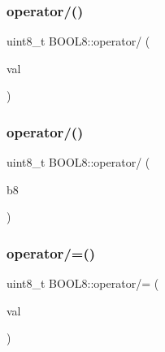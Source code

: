 \hypertarget{struct_b_o_o_l8_a10e18bcb3b312d506817ffc60765ba6b}{}\label{struct_b_o_o_l8_a10e18bcb3b312d506817ffc60765ba6b} 
\subsubsection{\texorpdfstring{operator/()}{operator/()}\hspace{0.1cm}{\footnotesize\ttfamily [1/2]}}
{\footnotesize\ttfamily uint8\+\_\+t B\+O\+O\+L8\+::operator/ (\begin{DoxyParamCaption}\item[{const uint8\+\_\+t}]{val }\end{DoxyParamCaption})\hspace{0.3cm}{\ttfamily [inline]}}

\hypertarget{struct_b_o_o_l8_a89f1bf36c915e91e5201ef357ee845d7}{}\label{struct_b_o_o_l8_a89f1bf36c915e91e5201ef357ee845d7} 
\subsubsection{\texorpdfstring{operator/()}{operator/()}\hspace{0.1cm}{\footnotesize\ttfamily [2/2]}}
{\footnotesize\ttfamily uint8\+\_\+t B\+O\+O\+L8\+::operator/ (\begin{DoxyParamCaption}\item[{const \hyperlink{struct_b_o_o_l8}{B\+O\+O\+L8}}]{b8 }\end{DoxyParamCaption})\hspace{0.3cm}{\ttfamily [inline]}}

\hypertarget{struct_b_o_o_l8_a09b75917ca736a613d80bbec1b290ad1}{}\label{struct_b_o_o_l8_a09b75917ca736a613d80bbec1b290ad1} 
\subsubsection{\texorpdfstring{operator/=()}{operator/=()}\hspace{0.1cm}{\footnotesize\ttfamily [1/2]}}
{\footnotesize\ttfamily uint8\+\_\+t B\+O\+O\+L8\+::operator/= (\begin{DoxyParamCaption}\item[{const uint8\+\_\+t}]{val }\end{DoxyParamCaption})\hspace{0.3cm}{\ttfamily [inline]}}

